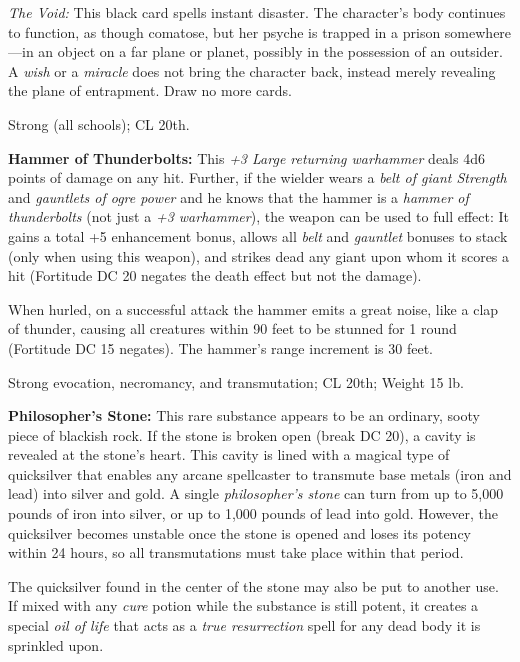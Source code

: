 \documentclass{article}
\begin{document}
\textit{The Void: }This black card spells instant disaster. The character's body 
continues to function, as though comatose, but her psyche is trapped in a prison 
somewhere---in an object on a far plane or planet, possibly in the possession of 
an outsider. A \textit{wish }or a \textit{miracle }does not bring the character 
back, instead merely revealing the plane of entrapment. Draw no more cards.

Strong (all schools); CL 20th.

\vspace{12pt}
\textbf{Hammer of Thunderbolts:} This \textit{+3 Large returning warhammer }deals 
4d6 points of damage on any hit. Further, if the wielder wears a \textit{belt of 
giant Strength }and \textit{gauntlets of ogre power }and he knows that the hammer 
is a \textit{hammer of thunderbolts }(not just a \textit{+3 warhammer}), the weapon 
can be used to full effect: It gains a total +5 enhancement bonus, allows all \textit{belt 
}and \textit{gauntlet }bonuses to stack (only when using this weapon), and strikes 
dead any giant upon whom it scores a hit (Fortitude DC 20 negates the death effect 
but not the damage).

When hurled, on a successful attack the hammer emits a great noise, like a clap 
of thunder, causing all creatures within 90 feet to be stunned for 1 round (Fortitude 
DC 15 negates). The hammer's range increment is 30 feet.

Strong evocation, necromancy, and transmutation; CL 20th; Weight 15 lb.

\vspace{12pt}
\textbf{Philosopher's Stone:} This rare substance appears to be an ordinary, sooty 
piece of blackish rock. If the stone is broken open (break DC 20), a cavity is 
revealed at the stone's heart. This cavity is lined with a magical type of quicksilver 
that enables any arcane spellcaster to transmute base metals (iron and lead) into 
silver and gold. A single \textit{philosopher's stone }can turn from up to 5,000 
pounds of iron into silver, or up to 1,000 pounds of lead into gold. However, the 
quicksilver becomes unstable once the stone is opened and loses its potency within 
24 hours, so all transmutations must take place within that period.

The quicksilver found in the center of the stone may also be put to another use. 
If mixed with any \textit{cure }potion while the substance is still potent, it 
creates a special \textit{oil of life }that acts as a \textit{true resurrection 
}spell for any dead body it is sprinkled upon.
\end{document}
